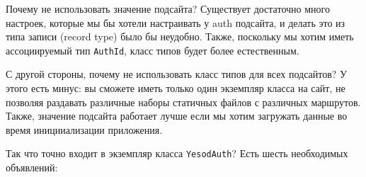 \begin{remark}
Почему не использовать значение подсайта? Существует достаточно много настроек, которые мы бы хотели настраивать у auth подсайта, и делать это из типа записи (record type) было бы неудобно. Также, поскольку мы хотим иметь ассоциируемый тип \lstinline'AuthId', класс типов будет более естественным.

С другой стороны, почему не использовать класс типов для всех подсайтов? У этого есть минус: вы сможете иметь только один экземпляр класса на сайт, не позволяя раздавать различные наборы статичных файлов с различных маршрутов. Также, значение подсайта работает лучше если мы хотим загружать данные во время иницииализации приложения.
\end{remark}

Так что точно входит в экземпляр класса \lstinline'YesodAuth'? Есть шесть необходимых объявлений:

